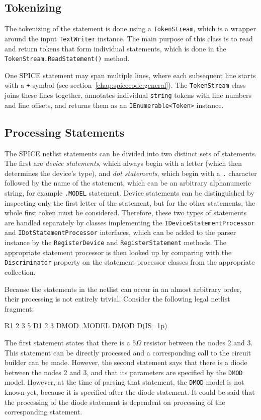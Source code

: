 \subsection{Tokenizing}
The tokenizing of the statement is done using a \texttt{TokenStream}, which is a wrapper around the input \texttt{TextWriter} instance. The main purpose of this class is to read and return tokens that form individual statements, which is done in the \texttt{TokenStream.ReadStatement()} method.

One SPICE statement may span multiple lines, where each subsequent line starts with a \texttt{+} symbol (see section~\ref{chap:spicecode:general}). The \texttt{TokenStream} class joins these lines together, annotates individual \texttt{string} tokens with line numbers and line offsets, and returns them as an \texttt{IEnumerable<Token>} instance.

\subsection{Processing Statements}
The SPICE netlist statements can be divided into two distinct sets of statements. The first are \textit{device statements}, which always begin with a letter (which then determines the device's type), and \textit{dot statements}, which begin with a \texttt{.} character followed by the name of the statement, which can be an arbitrary alphanumeric string, for example \texttt{.MODEL} statement. Device statements can be distinguished by inspecting only the first letter of the statement, but for the other statements, the whole first token must be considered. Therefore, these two types of statements are handled separately by classes implementing the \texttt{IDeviceStatementProcessor} and \texttt{IDotStatementProcessor} interfaces, which can be added to the parser instance by the \texttt{RegisterDevice} and \texttt{RegisterStatement} methods. The appropriate statement processor is then looked up by comparing with the \texttt{Discriminator} property on the statement processor classes from the appropriate collection. 

\pagebreak
Because the statements in the netlist can occur in an almost arbitrary order, their processing is not entirely trivial. Consider the following legal netlist fragment:

\begin{code}
R1 2 3 5
D1 2 3 DMOD
.MODEL DMOD D(IS=1p)
\end{code}

The first statement states that there is a $5\Omega$ resistor between the nodes 2 and 3. This statement can be directly processed and a corresponding call to the circuit builder can be made. However, the second statement says that there is a diode between the nodes 2 and 3, and that its parameters are specified by the \texttt{DMOD} model. However, at the time of parsing that statement, the \texttt{DMOD} model is not known yet, because it is specified after the diode statement. It could be said that the processing of the diode statement is dependent on processing of the corresponding  statement.

